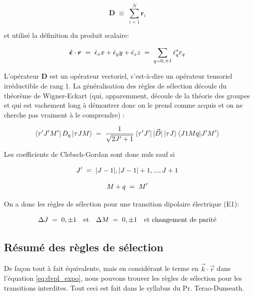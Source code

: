 \begin{equation*}
    \bm{D} \;\equiv\; \sum_{i=1}^N \bm{r}_i 
\end{equation*}

et utilisé la définition du produit scalaire:

\begin{equation}
    \hat{\bm{\epsilon}}\cdot \bm{r} \; = \; \hat{\epsilon}_xx + \hat{\epsilon}_yy + \hat{\epsilon}_zz \; = \; \sum_{q=0,\pm 1}  \hat{\epsilon}_q^* r_q
\end{equation}

L'opérateur $\bm{D}$ est un opérateur vectoriel, c'est-à-dire un opérateur tensoriel irréductible de rang 1. La généralisation des règles de sélection découle du théorème de Wigner-Eckart (qui, apparemment, découle de la théorie des groupes et qui est vachement long à démontrer donc on le prend comme acquis et on ne cherche pas vraiment à le comprendre) :

\begin{equation}
    \bra{\tau ' J'M'}D_q\ket{\tau JM}\; = \; \dfrac{1}{\sqrt{2J'+1}}\bra{\tau 'J'}|\vec{D}|\ket{\tau J}\bra{J1Mq}\ket{J'M'}
\end{equation}

Les coefficients de Clebsch-Gordan sont donc nuls sauf si 

\begin{equation*}
    J'\; = \; |J-1|, |J-1|+1, ..., J+1
\end{equation*}

\begin{equation*}
    M+q\; = \; M'
\end{equation*}

On a donc les règles de sélection pour une transition dipolaire électrique (E1): 

\begin{equation}
    \Delta J\; = \; 0, \pm1 \quad \text{et} \quad \Delta M\; = \; 0, \pm 1 \quad \text{et        changement de parité}
\end{equation}


\newpage %
\subsection{Résumé des règles de sélection}

De façon tout à fait équivalente, mais en considérant le terme en $\vec{k}\cdot\vec{r}$ dans l'équation \eqref{eq:dvpl_expo}, nous pouvons trouver les règles de sélection pour les transitions interdites. Tout ceci est fait dans le syllabus du Pr. Terao-Dunseath.


